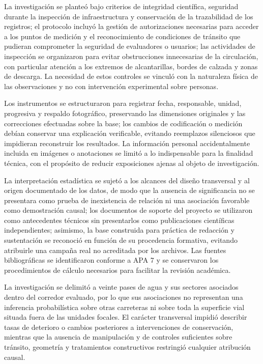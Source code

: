 La investigación se planteó bajo criterios de integridad científica, seguridad durante la inspección de infraestructura y conservación de la trazabilidad de los registros; el protocolo incluyó la gestión de autorizaciones necesarias para acceder a los puntos de medición y el reconocimiento de condiciones de tránsito que pudieran comprometer la seguridad de evaluadores o usuarios; las actividades de inspección se organizaron para evitar obstrucciones innecesarias de la circulación, con particular atención a los extremos de alcantarillas, bordes de calzada y zonas de descarga. La necesidad de estos controles se vinculó con la naturaleza física de las observaciones y no con intervención experimental sobre personas.

Los instrumentos se estructuraron para registrar fecha, responsable, unidad, progresiva y respaldo fotográfico, preservando las dimensiones originales y las correcciones efectuadas sobre la base; los cambios de codificación o medición debían conservar una explicación verificable, evitando reemplazos silenciosos que impidieran reconstruir los resultados. La información personal accidentalmente incluida en imágenes o anotaciones se limitó a lo indispensable para la finalidad técnica, con el propósito de reducir exposiciones ajenas al objeto de investigación.

La interpretación estadística se sujetó a los alcances del diseño transversal y al origen documentado de los datos, de modo que la ausencia de significancia no se presentara como prueba de inexistencia de relación ni una asociación favorable como demostración causal; los documentos de soporte del proyecto se utilizaron como antecedentes técnicos sin presentarlos como publicaciones científicas independientes; asimismo, la base construida para práctica de redacción y sustentación se reconoció en función de su procedencia formativa, evitando atribuirle una campaña real no acreditada por los archivos. Las fuentes bibliográficas se identificaron conforme a APA 7 y se conservaron los procedimientos de cálculo necesarios para facilitar la revisión académica.


La investigación se delimitó a veinte pases de agua y sus sectores asociados dentro del corredor evaluado, por lo que sus asociaciones no representan una inferencia probabilística sobre otras carreteras ni sobre toda la superficie vial situada fuera de las unidades focales. El carácter transversal impidió describir tasas de deterioro o cambios posteriores a intervenciones de conservación, mientras que la ausencia de manipulación y de controles suficientes sobre tránsito, geometría y tratamientos constructivos restringió cualquier atribución causal.

